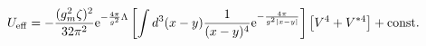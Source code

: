\begin{equation}
U_{\rm eff}=-\frac{(g_m^2\zeta)^2}{32\pi^2}{\rm e}^{-{4\pi\over
g^2}\Lambda}\left[\int d^3(x-y){1\over(x-y)^4}{\rm e}^{-{4\pi\over g^2
|x-y|}}\right]\left[V^4+V^{*4}\right]+{\rm const.}
\label{integral}\end{equation} 
